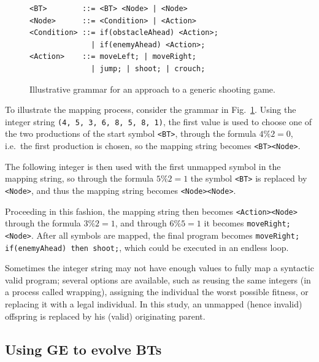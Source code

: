 \documentclass[conference]{IEEEtran}
\begin{document}
\begin{figure}
	\begin{verbatim}
<BT>        ::= <BT> <Node> | <Node>
<Node>      ::= <Condition> | <Action>
<Condition> ::= if(obstacleAhead) <Action>;
              | if(enemyAhead) <Action>;
<Action>    ::= moveLeft; | moveRight;
              | jump; | shoot; | crouch;
	\end{verbatim}
	\caption{Illustrative grammar for an approach to a generic shooting
	game.}
	\label{fig:exgrammar}
\end{figure}

To illustrate the mapping process, consider the grammar in
Fig.~\ref{fig:exgrammar}. Using the integer string \texttt{(4, 5, 3, 6, 8, 5,
8, 1)}, the first value is used to choose one of the two productions of the
start symbol \texttt{<BT>}, through the formula $4 \% 2 = 0$, i.e.~the first
production is chosen, so the mapping string becomes \texttt{<BT><Node>}. 

The following integer is then used with the first unmapped symbol in the
mapping string, so through the formula $5 \% 2 = 1$ the symbol \texttt{<BT>} is
replaced by \texttt{<Node>}, and thus the mapping string becomes
\texttt{<Node><Node>}.

Proceeding in this fashion, the mapping string then becomes
\texttt{<Action><Node>} through the formula $3 \% 2 = 1$, and through $6 \% 5 =
1$ it becomes \texttt{moveRight; <Node>}. After all symbols are mapped, the
final program becomes \texttt{moveRight; if(enemyAhead) then shoot;}, which
could be executed in an endless loop.

Sometimes the integer string may not have enough values to fully map a
syntactic valid program; several options are available, such as reusing the
same integers (in a process called wrapping\cite{OR03}), assigning the
individual the worst possible fitness, or replacing it with a legal individual.
In this study, an unmapped (hence invalid) offspring is replaced by his (valid)
originating parent.


\subsection{Using GE to evolve BTs} \label{subsec:incGE}
\end{document}
